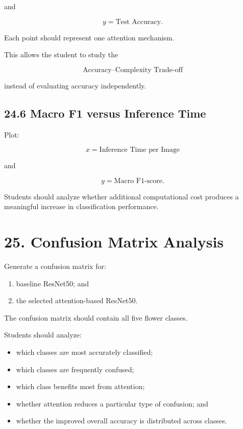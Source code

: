 \documentclass[10pt]{article}
\begin{document}
and

\[
y=
\text{Test Accuracy}.
\]

Each point should represent one attention mechanism.

This allows the student to study the

\[
\boxed{
\text{Accuracy--Complexity Trade-off}
}
\]

instead of evaluating accuracy independently.

\subsection*{24.6 Macro F1 versus Inference Time}

Plot:

\[
x=
\text{Inference Time per Image}
\]

and

\[
y=
\text{Macro F1-score}.
\]

Students should analyze whether additional computational cost produces a
meaningful increase in classification performance.

\section*{25. Confusion Matrix Analysis}

Generate a confusion matrix for:

\begin{enumerate}

\item baseline ResNet50; and

\item the selected attention-based ResNet50.

\end{enumerate}

The confusion matrix should contain all five flower classes.

Students should analyze:

\begin{itemize}

\item which classes are most accurately classified;

\item which classes are frequently confused;

\item which class benefits most from attention;

\item whether attention reduces a particular type of confusion; and

\item whether the improved overall accuracy is distributed across classes.

\end{itemize}
\end{document}
